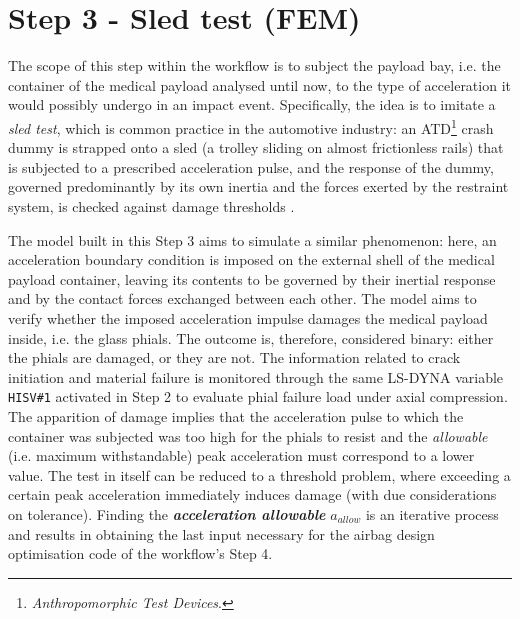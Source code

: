 
\section{Step 3 - Sled test (FEM)}\label{section:step3-sledTest}
The scope of this step within the workflow is to subject the payload bay, i.e. the container of the medical payload analysed until now, to the type of acceleration it would possibly undergo in an impact event. Specifically, the idea is to imitate a \textit{sled test}, which is common practice in the automotive industry: an ATD\footnote{\textit{Anthropomorphic Test Devices}.} crash dummy is strapped onto a sled (a trolley sliding on almost frictionless rails) that is subjected to a prescribed acceleration pulse, and the response of the dummy, governed predominantly by its own inertia and the forces exerted by the restraint system, is checked against damage thresholds \cite{Park2017}. 

The model built in this Step 3 aims to simulate a similar phenomenon: here, an acceleration boundary condition is imposed on the external shell of the medical payload container, leaving its contents to be governed by their inertial response and by the contact forces exchanged between each other. The model aims to verify whether the imposed acceleration impulse damages the medical payload inside, i.e. the glass phials. The outcome is, therefore, considered binary: either the phials are damaged, or they are not. The information related to crack initiation and material failure is monitored through the same LS-DYNA variable \texttt{HISV\#1} activated in Step 2 to evaluate phial failure load under axial compression. The apparition of damage implies that the acceleration pulse to which the container was subjected was too high for the phials to resist and the \textit{allowable} (i.e. maximum withstandable) peak acceleration must correspond to a lower value. The test in itself can be reduced to a threshold problem, where exceeding a certain peak acceleration immediately induces damage (with due considerations on tolerance). Finding the \textbf{\textit{acceleration allowable}} $a_{allow}$ is an iterative process and results in obtaining the last input necessary for the airbag design optimisation code of the workflow's Step 4.

